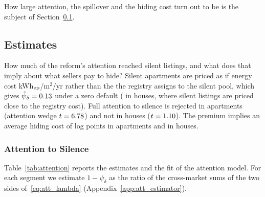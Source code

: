 How large attention, the spillover and the hiding cost turn out to be is the subject of Section~\ref{sec:results}.

\subsection{Estimates}
\label{sec:results}

How much of the reform's attention reached silent listings, and what does that imply about what sellers pay to hide? Silent apartments are priced as if energy cost \attCstarApt{} kWh$_{\rm ep}$/m$^2$/yr rather than the \attCsilApt{} the registry assigns to the silent pool, which gives $\hat\psi_\delta=0.13{}$ under a zero default (\attPsiHouse{} in houses, where silent listings are priced close to the registry cost). Full attention to silence is rejected in apartments (attention wedge $t=6.78$) and not in houses ($t=1.10$). The premium implies an average hiding cost of \attDthreeApt{} log points in apartments and \attDthreeHouse{} in houses.

\subsubsection{Attention to Silence}
\label{ss:att_estimates}

Table~\ref{tab:attention} reports the estimates and the fit of the attention model. For each segment we estimate $1-\psi_\delta$ as the ratio of the cross-market sums of the two sides of~\eqref{eq:att_lambda} (Appendix~\ref{app:att_estimator}).

